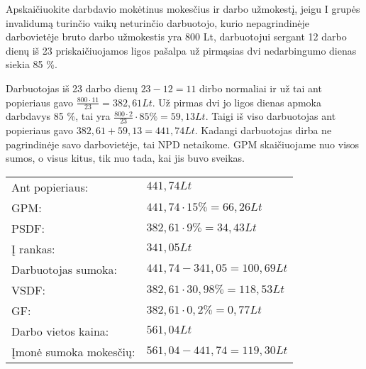 \begin{tasks}
\begin{task}
\begin{solution}
      
    \end{solution}
  \end{task}

  \begin{task}
    \begin{condition}
      Apskaičiuokite darbdavio mokėtinus mokesčius ir darbo
      užmokestį, jeigu I grupės invalidumą turinčio vaikų neturinčio
      darbuotojo, kurio nepagrindinėje darbovietėje bruto darbo
      užmokestis yra 800 Lt, darbuotojui sergant 12 darbo dienų iš 23
      priskaičiuojamos ligos pašalpa už pirmąsias dvi nedarbingumo
      dienas siekia 85 \%.
    \end{condition}
    \begin{solution}
      Darbuotojas iš 23 darbo dienų $23 - 12 = 11$ dirbo normaliai
      ir už tai ant popieriaus gavo
      $\frac{800 \cdot 11}{23} = 382,61 Lt$. Už pirmas dvi jo
      ligos dienas apmoka darbdavys 85 \%, tai yra
      $\frac{800 \cdot 2}{23} \cdot 85\% = 59,13 Lt$.
      Taigi iš viso darbuotojas ant popieriaus gavo
      $382,61 + 59,13 = 441,74 Lt$. Kadangi darbuotojas dirba
      ne pagrindinėje savo darbovietėje, tai NPD netaikome.
      GPM skaičiuojame nuo visos sumos, o visus kitus, tik
      nuo tada, kai jis buvo sveikas.

      \begin{tabularx}{15cm}{p{7.5cm}|p{7.5cm}}
        Ant popieriaus: & $441,74Lt$ \\
        GPM: & $441,74 \cdot 15\% = 66,26Lt$ \\
        PSDF: & $382,61 \cdot 9\% = 34,43Lt$ \\
        Į rankas: & $341,05Lt$ \\
        Darbuotojas sumoka: & $441,74 - 341,05 = 100,69Lt$ \\
        VSDF: & $382,61 \cdot 30,98\% = 118,53Lt$ \\
        GF: & $382,61 \cdot 0,2\% = 0,77Lt$ \\
        Darbo vietos kaina: & $561,04Lt$ \\
        Įmonė sumoka mokesčių: & $561,04 - 441,74 = 119,30Lt$ \\
      \end{tabularx}

    \end{solution}
  \end{task}


\end{tasks}
